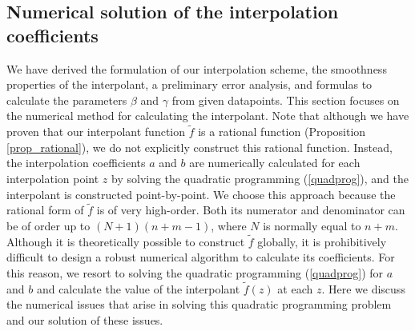 \subsection{Numerical solution of the interpolation coefficients}
\label{s:numerical_coefficient}
We have derived the formulation of our interpolation scheme, the smoothness
properties of the interpolant, a preliminary error analysis, and formulas
to calculate the parameters $\beta$ and $\gamma$ from given datapoints.
This section focuses on the numerical method for calculating the interpolant.
Note that although we have proven that our interpolant function $\tilde f$ is
a rational function (Proposition \ref{prop_rational}), we do not explicitly
construct this rational function.
Instead, the interpolation coefficients $a$ and $b$ are numerically calculated
for each interpolation point $z$ by solving the quadratic programming
(\ref{quadprog}), and the interpolant is constructed point-by-point.
We choose this approach because the rational form of $\tilde f$ is of very
high-order.  Both its numerator and denominator can be of order up to
$(N+1)(n+m-1)$, where $N$ is normally equal to $n+m$.
Although it is theoretically possible to construct $\tilde f$ globally, it is
prohibitively difficult to design a robust numerical algorithm to calculate its
coefficients.  For this reason, we resort to solving the quadratic programming
(\ref{quadprog}) for $a$ and $b$ and calculate the value of the interpolant
${\tilde f}(z)$ at each $z$.
Here we discuss the numerical issues that arise in solving
this quadratic programming problem and our solution of these issues.

